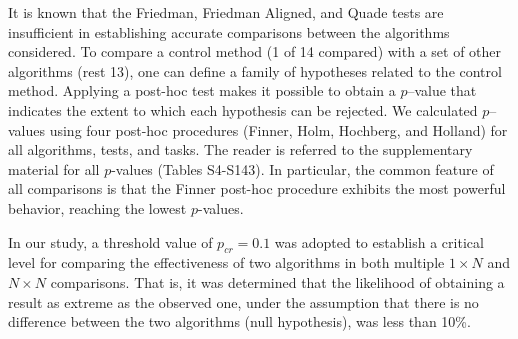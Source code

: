 \documentclass[a4paper,fleqn]{cas-sc}
\begin{document}
It is known \cite{Derrac2011} that
the Friedman, Friedman Aligned, and Quade tests are insufficient in establishing accurate comparisons between the algorithms considered.
To compare a control method (1 of 14 compared) with a set of other algorithms (rest 13),
one can define a family of hypotheses related to the control method.
Applying a post-hoc test makes it possible to obtain a $p$--value that indicates the extent to which each hypothesis can be rejected.
We calculated $p$--values using four post-hoc procedures (Finner, Holm, Hochberg, and Holland) for all algorithms, tests, and tasks.
The reader is referred to the supplementary material for all $p$-values (Tables S4-S143).
In particular, the common feature of all comparisons is that
the Finner post-hoc procedure exhibits the most powerful behavior,
reaching the lowest $p$-values.


In our study, a threshold value of $p_{cr}=0.1$ was adopted to establish a critical level
for comparing the effectiveness of two algorithms in both multiple $1\times N$ and $N\times N$ comparisons.
That is, it was determined that the likelihood of obtaining a result as extreme as the observed one,
under the assumption that there is no difference between the two algorithms (null hypothesis), was less than 10\%.
\end{document}
